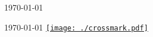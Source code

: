 \documentclass[11pt, a4paper,final]{russell}
\begin{document}
\makecvheader
\makecvfooter
{\today}
{}
{\thepage}







%


\vspace*{\fill}


\makecvfooter
{\today}
{\href{https://DhimanSarkar.github.io/myResume/index.html?pdfVersion=\ifdef{\pdfVersion}{\pdfVersion}{}}{\texttt{[image: ./crossmark.pdf]}}}
{\thepage}
\end{document}
